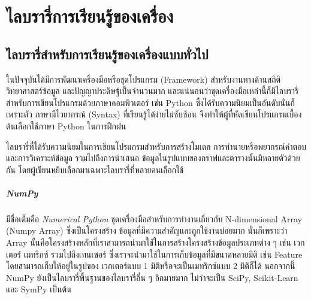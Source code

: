 

\chapter{ไลบรารี่การเรียนรู้ของเครื่อง}
\label{ch:library_ml}

\section{ไลบรารี่สำหรับการเรียนรู้ของเครื่องแบบทั่วไป}
\label{sec:lib_ml}

ในปัจจุบันได้มีการพัฒนาเครื่องมือหรือชุดโปรแกรม (Framework) สำหรับงานทางด้านสถิติ วิทยาศาสตร์ข้อมูล และปัญญาประดิษฐ์เป็นจำนวนมาก
และแน่นอนว่าชุดเครื่องมือเหล่านี้ก็มีไลบรารี่สำหรับการเขียนโปรแกรมด้วยภาษาคอมพิวเตอร์ เช่น Python ซึ่งได้รับความนิยมเป็นอันดับนั่นก็เพราะตัว%
ภาษามีไวยากรณ์ (Syntax) ที่เรียนรู้ได้ง่ายไม่ซับซ้อน จึงทำให้ผู้ที่หัดเขียนโปรแกรมเบื้องต้นเลือกใช้ภาษา Python ในการฝึกฝน 

ไลบรารี่ที่ได้รับความนิยมในการเขียนโปรแกรมสำหรับการสร้างโมเดล การทำนายหรือพยากรณ์คำตอบ และการวิเคราะห์ข้อมูล รวมไปถึงการนำเสนอ%
ข้อมูลในรูปแบบของกราฟและตารางนั้นมีหลายตัวด้วยกัน โดยผู้เขียนหยิบเลือกมาเฉพาะไลบรารี่ที่หลายคนเลือกใช้

\paragraph{NumPy}
มีชื่อเต็มคือ \textit{Numerical Python} ชุดเครื่องมือสำหรับการทำงานเกี่ยวกับ N-dimensional Array (Numpy Array) ซึ่งเป็นโครงสร้าง%
ข้อมูลที่มีความสำคัญและถูกใช้งานบ่อยมาก นั่นก็เพราะว่า Array นั้นคือโครงสร้างหลักที่เราสามารถนำมาใช้ในการสร้างโครงสร้างข้อมูลประเภทต่าง ๆ 
เช่น เวกเตอร์ เมทริกซ์ รวมไปถึงเทนเซอร์ ซึ่งเราจะนำมาใช้ในการเก็บข้อมูลที่มีขนาดหลายมิติ เช่น Feature โดยสามารถเก็บให้อยู่ในรูปของ%
เวกเตอร์แบบ 1 มิติหรือจะเป็นเมทริกซ์แบบ 2 มิติก็ได้ นอกจากนี้ NumPy ยังเป็นไลบรารี่พื้นฐานของไลบรารี่อื่น ๆ อีกมายมาก ไม่ว่าจะเป็น SciPy, 
Scikit-Learn และ SymPy เป็นต้น


